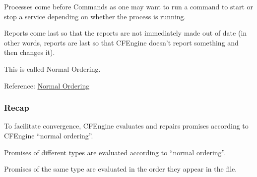 Processes come before Commands as one may want to run a command to start
or stop a service depending on whether the process is running.





Reports come last so that the reports are not immediately made out of
date (in other words, reports are last so that CFEngine doesn't report
something and then changes it).





This is called Normal Ordering.

Reference: \href{https://docs.cfengine.com/latest/reference-language-concepts-normal-ordering.html}{Normal
Ordering}





\subsubsection{Recap}

To facilitate convergence, CFEngine evaluates and repairs
promises according to CFEngine ``normal ordering''.

Promises of different types are evaluated according to ``normal ordering''.

Promises of the same type are evaluated in the order they appear in the file.

